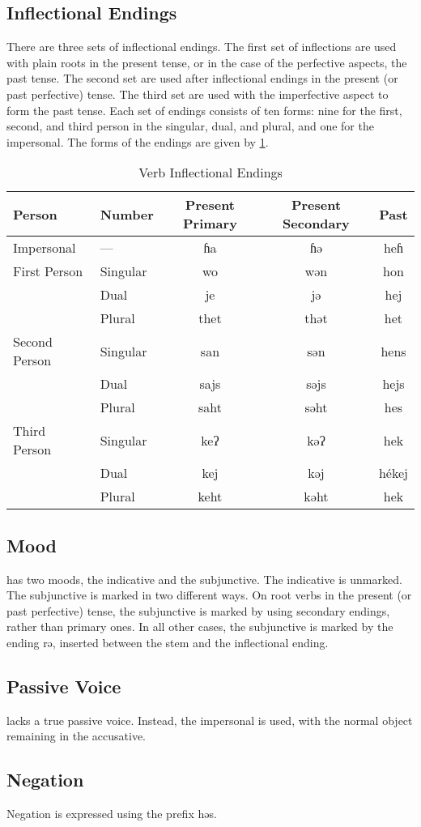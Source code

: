 \subsection{Inflectional Endings}
There are three sets of inflectional endings. The first set of inflections are
used with plain roots in the present tense, or in the case of the perfective
aspects, the past tense. The second set are used after inflectional endings in
the present (or past perfective) tense. The third set are used with the
imperfective aspect to form the past tense. Each set of endings consists of ten
forms: nine for the first, second, and third person in the singular, dual, and
plural, and one for the impersonal. The forms of the endings are given by
\cref{tab:verb inflectional endings}.

\begin{table}[h]
\centering
\caption{Verb Inflectional Endings}
\label{tab:verb inflectional endings}
\begin{tabular}{ll*{3}{>{\ll}c}}
    \toprule
    Person & Number & \rm \parbox{2cm}{\centering Present Primary} & \rm
    \parbox{2cm}{\centering Present Secondary} & \rm Past \\ \midrule
    Impersonal    & —        & ɦa   & ɦə   & heɦ   \\ \midrule
    First Person  & Singular & wo   & wən  & hon   \\
                  & Dual     & je   & jə   & hej   \\
                  & Plural   & thet & thət & het   \\ \midrule
    Second Person & Singular & san  & sən  & hens  \\
                  & Dual     & sajs & səjs & hejs  \\
                  & Plural   & saht & səht & hes   \\ \midrule
    Third Person  & Singular & keʔ  & kəʔ  & hek   \\
                  & Dual     & kej  & kəj  & hékej \\
                  & Plural   & keht & kəht & hek   \\
    \bottomrule
\end{tabular}
\end{table}

\subsection{Mood}
\Langname{} has two moods, the indicative and the subjunctive. The indicative
is unmarked. The subjunctive is marked in two different ways. On root verbs in
the present (or past perfective) tense, the subjunctive is marked by using
secondary endings, rather than primary ones. In all other cases, the
subjunctive is marked by the ending {\ll rə}, inserted between the stem and the
inflectional ending.

\subsection{Passive Voice}
\Langname{} lacks a true passive voice. Instead, the impersonal is used, with
the normal object remaining in the accusative.

\subsection{Negation}
Negation is expressed using the prefix {\ll həs}.

